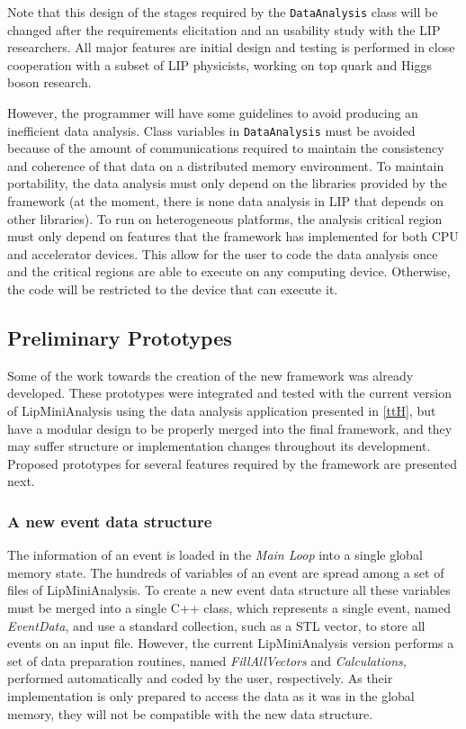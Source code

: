 Note that this design of the stages required by the \texttt{DataAnalysis} class will be changed after the requirements elicitation and an usability study with the LIP researchers. All major features are initial design and testing is performed in close cooperation with a subset of LIP physicists, working on top quark and Higgs boson research.

However, the programmer will have some guidelines to avoid producing an inefficient data analysis. Class variables in \texttt{DataAnalysis} must be avoided because of the amount of communications required to maintain the consistency and coherence of that data on a distributed memory environment. To maintain portability, the data analysis must only depend on the libraries provided by the framework (at the moment, there is none data analysis in LIP that depends on other libraries). To run on heterogeneous platforms, the analysis critical region must only depend on features that the framework has implemented for both CPU and accelerator devices. This allow for the user to code the data analysis once and the critical regions are able to execute on any computing device. Otherwise, the code will be restricted to the device that can execute it.

\subsection{Preliminary Prototypes}
\label{work_so_far}

Some of the work towards the creation of the new framework was already developed. These prototypes were integrated and tested with the current version of LipMiniAnalysis using the \ttH data analysis application presented in \ref{ttH}, but have a modular design to be properly merged into the final framework, and they may suffer structure or implementation changes throughout its development. Proposed prototypes for several features required by the framework are presented next.

\subsubsection*{A new event data structure}

The information of an event is loaded in the \textit{Main Loop} into a single global memory state. The hundreds of variables of an event are spread among a set of files of LipMiniAnalysis. To create a new event data structure all these variables must be merged into a single C++ class, which represents a single event, named \textit{EventData}, and use a standard collection, such as a STL vector, to store all events on an input file. However, the current LipMiniAnalysis version performs a set of data preparation routines, named \textit{FillAllVectors} and \textit{Calculations}, performed automatically and coded by the user, respectively. As their implementation is only prepared to access the data as it was in the global memory, they will not be compatible with the new data structure. 

